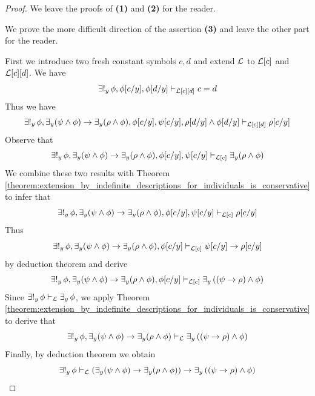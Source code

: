 \documentclass[10pt]{amsart}
\begin{document}
\begin{proof}
	We leave the proofs of \textbf{(1)} and \textbf{(2)} for the reader.

	We prove the more difficult direction of the assertion \textbf{(3)} and leave the other part for the reader.

  First we introduce two fresh constant symbols $c,d$ and extend ${\mathcal L}$ to ${\mathcal L}[c]$ and ${\mathcal L}[c][d]$. We have
	$$\exists!_y\,\phi,\phi[c/y],\phi[d/y] \vdash_{{\mathcal L}[c][d]} c = d$$
  Thus we have
	$$\exists!_y\,\phi,\exists_y(\psi \wedge \phi) \rightarrow \exists_y(\rho \wedge \phi),\phi[c/y], \psi[c/y], \rho[d/y]\wedge \phi[d/y] \vdash_{{\mathcal L}[c][d]} \rho[c/y]$$
	Observe that
	$$\exists!_y\,\phi,\exists_y(\psi \wedge \phi) \rightarrow \exists_y(\rho \wedge \phi),\phi[c/y],\psi[c/y] \vdash_{{\mathcal L}[c]} \exists_y(\rho \wedge \phi)$$
	We combine these two results with Theorem \ref{theorem:extension_by_indefinite_descriptions_for_individuals_is_conservative} to infer that
  $$\exists!_y\,\phi,\exists_y(\psi \wedge \phi) \rightarrow \exists_y(\rho \wedge \phi),\phi[c/y],\psi[c/y] \vdash_{{\mathcal L}[c]} \rho[c/y]$$
	Thus
	$$\exists!_y\,\phi,\exists_y(\psi \wedge \phi) \rightarrow \exists_y(\rho \wedge \phi),\phi[c/y] \vdash_{{\mathcal L}[c]}\psi[c/y] \rightarrow \rho[c/y]$$
	by deduction theorem and derive
	$$\exists!_y\,\phi,\exists_y(\psi \wedge \phi) \rightarrow \exists_y(\rho \wedge \phi),\phi[c/y] \vdash_{{\mathcal L}[c]} \exists_y\left((\psi \rightarrow \rho) \wedge \phi\right)$$
	Since $\exists!_y\,\phi \vdash_{{\mathcal L}}\exists_y\,\phi$, we apply Theorem \ref{theorem:extension_by_indefinite_descriptions_for_individuals_is_conservative} to derive that
	$$\exists!_y\,\phi,\exists_y(\psi \wedge \phi) \rightarrow \exists_y(\rho \wedge \phi) \vdash_{{\mathcal L}} \exists_y\left((\psi \rightarrow \rho) \wedge \phi\right)$$
	Finally, by deduction theorem we obtain
  $$\exists!_y\,\phi \vdash_{{\mathcal L}} \left(\exists_y(\psi \wedge \phi) \rightarrow \exists_y(\rho \wedge \phi)\right) \rightarrow \exists_y\left((\psi \rightarrow \rho) \wedge \phi\right)$$
\end{proof}
\end{document}
